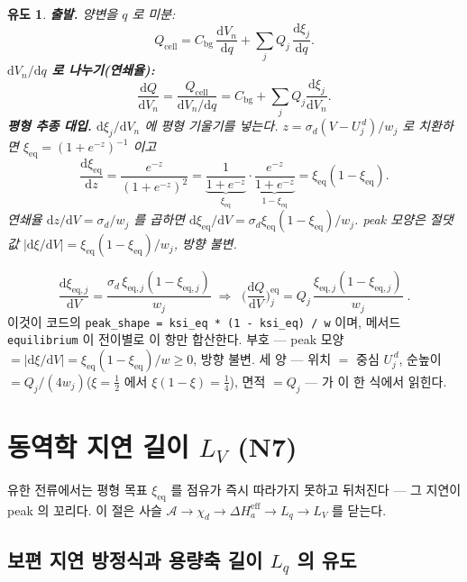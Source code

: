 \documentclass[11pt,a4paper]{article}
\newtheorem*{derivebox}{유도}
\newcommand{\dd}{\mathrm{d}}
\newcommand{\eff}{\mathrm{eff}}
\newcommand{\eq}{\mathrm{eq}}
\newcommand{\cell}{\mathrm{cell}}
\newcommand{\bg}{\mathrm{bg}}
\newcommand{\code}[1]{\texttt{#1}}
\begin{document}
\begin{derivebox}
\textbf{출발.} 양변을 $q$ 로 미분:
\begin{equation*}
Q_\cell=C_\bg\,\frac{\dd V_n}{\dd q}+\sum_j Q_j\,\frac{\dd\xi_j}{\dd q}.
\end{equation*}
\textbf{$\dd V_n/\dd q$ 로 나누기(연쇄율):}
\begin{equation*}
\frac{\dd Q}{\dd V_n}=\frac{Q_\cell}{\dd V_n/\dd q}=C_\bg+\sum_j Q_j\frac{\dd\xi_j}{\dd V_n}.
\end{equation*}
\textbf{평형 추종 대입.} $\dd\xi_j/\dd V_n$ 에 평형 기울기를 넣는다. $z=\sigma_d(V-U_j^{\,d})/w_j$ 로 치환하면
$\xi_\eq=(1+e^{-z})^{-1}$ 이고
\begin{equation*}
\frac{\dd\xi_\eq}{\dd z}
=\frac{e^{-z}}{(1+e^{-z})^2}
=\underbrace{\frac{1}{1+e^{-z}}}_{\xi_\eq}\cdot\underbrace{\frac{e^{-z}}{1+e^{-z}}}_{1-\xi_\eq}
=\xi_\eq(1-\xi_\eq).
\end{equation*}
연쇄율 $\dd z/\dd V=\sigma_d/w_j$ 를 곱하면 $\dd\xi_\eq/\dd V=\sigma_d\xi_\eq(1-\xi_\eq)/w_j$.
peak 모양은 절댓값 $|\dd\xi/\dd V|=\xi_\eq(1-\xi_\eq)/w_j$, 방향 불변.
\end{derivebox}
\begin{equation}
\frac{\dd\xi_{\eq,j}}{\dd V}=\frac{\sigma_d\,\xi_{\eq,j}(1-\xi_{\eq,j})}{w_j}
\;\Longrightarrow\;
\boxed{\;\Big(\frac{\dd Q}{\dd V}\Big)^\eq_j
=Q_j\,\frac{\xi_{\eq,j}(1-\xi_{\eq,j})}{w_j}\;.}
\label{eq:eqpeak}
\end{equation}
이것이 코드의 \code{peak\_shape = ksi\_eq * (1 - ksi\_eq) / w} 이며, 메서드 \code{equilibrium} 이 전이별로 이 항만
합산한다. 부호 — peak 모양 $=|\dd\xi/\dd V|=\xi_\eq(1-\xi_\eq)/w\ge0$, 방향 불변. 세 양 — 위치 $=$ 중심
$U_j^{\,d}$, 순높이 $=Q_j/(4w_j)$($\xi=\tfrac12$ 에서 $\xi(1-\xi)=\tfrac14$), 면적 $=Q_j$ — 가 이 한 식에서 읽힌다.

\section{동역학 지연 길이 $L_V$ (N7)}\label{sec:lag}
유한 전류에서는 평형 목표 $\xi_\eq$ 를 점유가 즉시 따라가지 못하고 뒤처진다 — 그 지연이 peak 의 꼬리다.
이 절은 사슬 $\mathcal A\to\chi_d\to\Delta H_a^\eff\to L_q\to L_V$ 를 닫는다.

\subsection{보편 지연 방정식과 용량축 길이 $L_q$ 의 유도}
\end{document}
